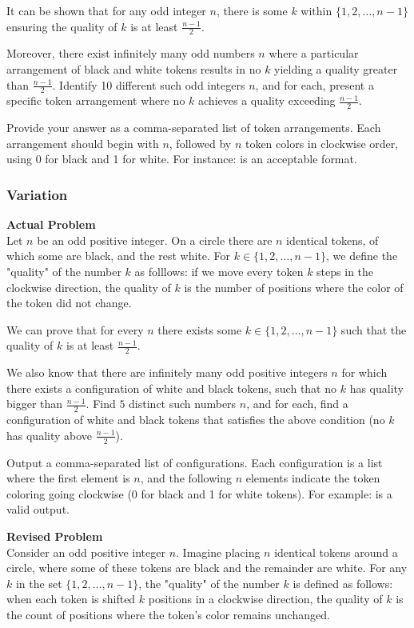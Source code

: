 It can be shown that for any odd integer \( n \), there is some \( k \) within \(\{1, 2, \ldots, n-1\}\) ensuring the quality of \( k \) is at least \(\frac{n-1}{2}\).

Moreover, there exist infinitely many odd numbers \( n \) where a particular arrangement of black and white tokens results in no \( k \) yielding a quality greater than \(\frac{n-1}{2}\).
Identify 10 different such odd integers \( n \), and for each, present a specific token arrangement where no \( k \) achieves a quality exceeding \(\frac{n-1}{2}\).

Provide your answer as a comma-separated list of token arrangements. Each arrangement should begin with \( n \), followed by \( n \) token colors in clockwise order, using 0 for black and 1 for white. For instance:  is an acceptable format.

\subsubsection{Variation}
\textbf{Actual Problem}\\
Let $n$ be an odd positive integer. On a circle there are $n$ identical tokens, of which some are black, and the rest white. For $k \in \{1, 2, \ldots, n-1\}$, we define the "quality" of the number $k$ as folllows: if we move every token $k$ steps in the clockwise direction, the quality of $k$ is the number of positions where the color of the token did not change. 

We can prove that for every $n$ there exists some $k \in \{1, 2, \ldots, n-1\}$ such that the quality of $k$ is at least $\frac{n-1}{2}$.

We also know that there are infinitely many odd positive integers $n$ for which there exists a configuration of white and black tokens, such that no $k$ has quality bigger than $\frac{n-1}{2}$.
Find $5$ distinct such numbers $n$, and for each, find a configuration of white and black tokens that satisfies the above condition (no $k$ has quality above $\frac{n-1}{2}$).


Output a comma-separated list of configurations. Each configuration is a list where the first element is $n$, and the following $n$ elements indicate the token coloring going clockwise (0 for black and 1 for white tokens). For example:  is a valid output.

\textbf{Revised Problem}\\
Consider an odd positive integer \( n \). Imagine placing \( n \) identical tokens around a circle, where some of these tokens are black and the remainder are white. For any \( k \) in the set \(\{1, 2, \ldots, n-1\}\), the "quality" of the number \( k \) is defined as follows: when each token is shifted \( k \) positions in a clockwise direction, the quality of \( k \) is the count of positions where the token's color remains unchanged.

